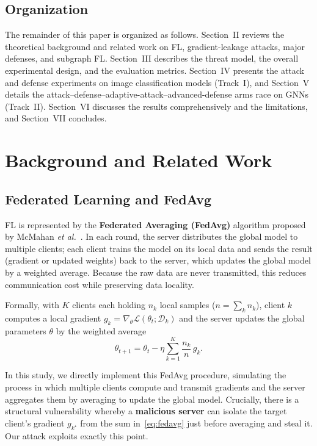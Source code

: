 \documentclass[conference]{IEEEtran}
\begin{document}
\subsection{Organization}
The remainder of this paper is organized as follows. Section~II reviews the
theoretical background and related work on FL, gradient-leakage attacks, major
defenses, and subgraph FL. Section~III describes the threat model, the overall
experimental design, and the evaluation metrics. Section~IV presents the attack
and defense experiments on image classification models (Track~I), and Section~V
details the attack--defense--adaptive-attack--advanced-defense arms race on GNNs
(Track~II). Section~VI discusses the results comprehensively and the limitations,
and Section~VII concludes.

\section{Background and Related Work}

\subsection{Federated Learning and FedAvg}
FL is represented by the \textbf{Federated Averaging (FedAvg)} algorithm
proposed by McMahan \textit{et al.}~\cite{mcmahan2017fedavg}. In each round, the
server distributes the global model to multiple clients; each client trains the
model on its local data and sends the result (gradient or updated weights) back
to the server, which updates the global model by a weighted average. Because the
raw data are never transmitted, this reduces communication cost while preserving
data locality.

Formally, with $K$ clients each holding $n_k$ local samples ($n=\sum_k n_k$),
client $k$ computes a local gradient $g_k=\nabla_\theta \mathcal{L}(\theta_t;
\mathcal{D}_k)$ and the server updates the global parameters $\theta$ by the
weighted average
\begin{equation}
\theta_{t+1}=\theta_t-\eta\sum_{k=1}^{K}\frac{n_k}{n}\,g_k .
\label{eq:fedavg}
\end{equation}

In this study, we directly implement this FedAvg procedure, simulating the
process in which multiple clients compute and transmit gradients and the server
aggregates them by averaging to update the global model. Crucially, there is a
structural vulnerability whereby a \textbf{malicious server} can isolate the
target client's gradient $g_{k^\star}$ from the sum in~\eqref{eq:fedavg} just
before averaging and steal it. Our attack exploits exactly this point.
\end{document}
